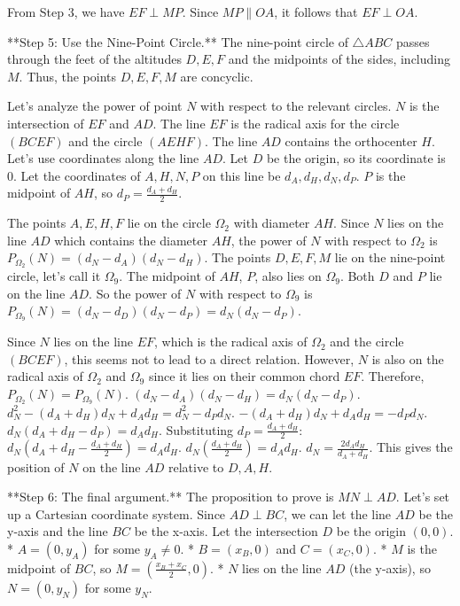 From Step 3, we have $EF \perp MP$. Since $MP \parallel OA$, it follows that $EF \perp OA$.

**Step 5: Use the Nine-Point Circle.**
The nine-point circle of $\triangle ABC$ passes through the feet of the altitudes $D,E,F$ and the midpoints of the sides, including $M$. Thus, the points $D, E, F, M$ are concyclic.

Let's analyze the power of point $N$ with respect to the relevant circles. $N$ is the intersection of $EF$ and $AD$.
The line $EF$ is the radical axis for the circle $(BCEF)$ and the circle $(AEHF)$.
The line $AD$ contains the orthocenter $H$. Let's use coordinates along the line $AD$. Let $D$ be the origin, so its coordinate is 0. Let the coordinates of $A, H, N, P$ on this line be $d_A, d_H, d_N, d_P$.
$P$ is the midpoint of $AH$, so $d_P = \frac{d_A+d_H}{2}$.

The points $A,E,H,F$ lie on the circle $\Omega_2$ with diameter $AH$. Since $N$ lies on the line $AD$ which contains the diameter $AH$, the power of $N$ with respect to $\Omega_2$ is $P_{\Omega_2}(N) = (d_N-d_A)(d_N-d_H)$.
The points $D,E,F,M$ lie on the nine-point circle, let's call it $\Omega_9$. The midpoint of $AH$, $P$, also lies on $\Omega_9$. Both $D$ and $P$ lie on the line $AD$. So the power of $N$ with respect to $\Omega_9$ is $P_{\Omega_9}(N) = (d_N-d_D)(d_N-d_P) = d_N(d_N-d_P)$.

Since $N$ lies on the line $EF$, which is the radical axis of $\Omega_2$ and the circle $(BCEF)$, this seems not to lead to a direct relation. However, $N$ is also on the radical axis of $\Omega_2$ and $\Omega_9$ since it lies on their common chord $EF$.
Therefore, $P_{\Omega_2}(N) = P_{\Omega_9}(N)$.
$(d_N-d_A)(d_N-d_H) = d_N(d_N-d_P)$.
$d_N^2 - (d_A+d_H)d_N + d_A d_H = d_N^2 - d_P d_N$.
$-(d_A+d_H)d_N + d_A d_H = -d_P d_N$.
$d_N(d_A+d_H-d_P) = d_A d_H$.
Substituting $d_P = \frac{d_A+d_H}{2}$:
$d_N(d_A+d_H-\frac{d_A+d_H}{2}) = d_A d_H$.
$d_N\left(\frac{d_A+d_H}{2}\right) = d_A d_H$.
$d_N = \frac{2d_A d_H}{d_A+d_H}$.
This gives the position of $N$ on the line $AD$ relative to $D, A, H$.

**Step 6: The final argument.**
The proposition to prove is $MN \perp AD$.
Let's set up a Cartesian coordinate system. Since $AD \perp BC$, we can let the line $AD$ be the y-axis and the line $BC$ be the x-axis. Let the intersection $D$ be the origin $(0,0)$.
* $A = (0, y_A)$ for some $y_A \neq 0$.
* $B = (x_B, 0)$ and $C = (x_C, 0)$.
* $M$ is the midpoint of $BC$, so $M = \left(\frac{x_B+x_C}{2}, 0\right)$.
* $N$ lies on the line $AD$ (the y-axis), so $N = (0, y_N)$ for some $y_N$.

